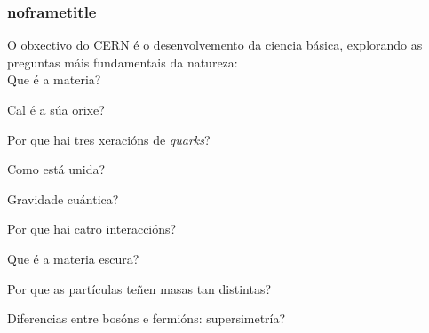 \documentclass{beamer}
\begin{document}
\begin{frame}[default, t]
  \frametitle{noframetitle}

  O obxectivo do CERN é o desenvolvemento da ciencia básica, explorando as
  preguntas máis fundamentais da natureza:\\[1cm]

  \centering
  \hspace*{-1cm} {\color{scqblue} \Huge {} Que é a materia?}

  \hspace*{3cm} {\color{scqgreen} \LARGE {} Cal é a súa orixe?}

  \hspace*{0cm} {\color{scqred} \LARGE {} Por que hai tres xeracións de \emph{quarks}?}

  {\color{scqindigo} \large {} Como está unida?}

  \hspace*{6cm} {\color{scqgreen} \Large {} Gravidade cuántica?}

  \hspace*{-5cm} {\color{scqblue} \LARGE {} Por que hai catro interaccións?}

  \hspace*{4cm} {\color{scqpink} \Huge {} Que é a materia escura?}

  \hspace*{-2cm} {\color{scqorange} \LARGE {} Por que as partículas teñen masas tan distintas?}

  \hspace*{-0cm} {\color{scqpurple} \LARGE {} Diferencias entre bosóns e fermións: supersimetría?}

\end{frame}
\end{document}
